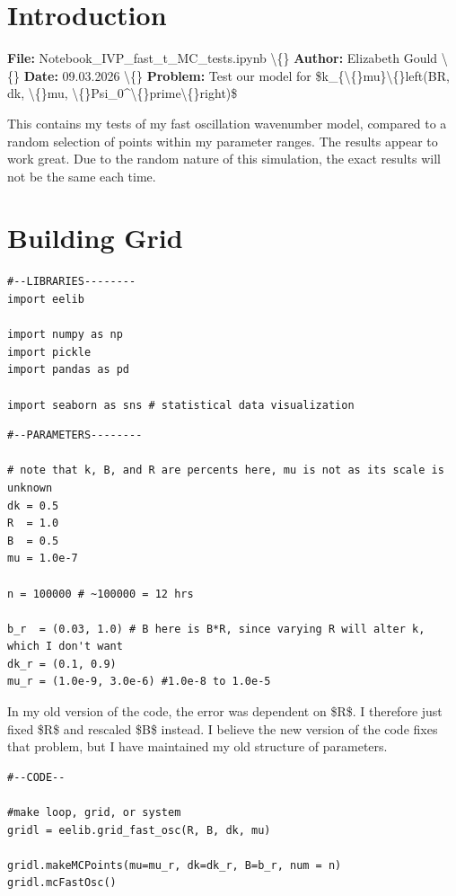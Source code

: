 \documentclass{article}
\begin{document}
\section{Introduction}


\textbf{File:} Notebook\_IVP\_fast\_t\_MC\_tests.ipynb 
\textbackslash\{\}
\textbf{Author:} Elizabeth Gould
\textbackslash\{\}
\textbf{Date:} 09.03.2026
\textbackslash\{\}
\textbf{Problem:} Test our model for \$k\_\{\textbackslash\{\}mu\}\textbackslash\{\}left(BR, dk, \textbackslash\{\}mu, \textbackslash\{\}Psi\_0\textasciicircum{}\textbackslash\{\}prime\textbackslash\{\}right)\$

This contains my tests of my fast oscillation wavenumber model, compared to a random selection of points within my parameter ranges. The results appear to work great. Due to the random nature of this simulation, the exact results will not be the same each time.

\section{Building Grid}

\begin{lstlisting}
#--LIBRARIES--------
import eelib

import numpy as np
import pickle
import pandas as pd

import seaborn as sns # statistical data visualization\end{lstlisting}

\begin{lstlisting}
#--PARAMETERS--------

# note that k, B, and R are percents here, mu is not as its scale is unknown
dk = 0.5
R  = 1.0
B  = 0.5
mu = 1.0e-7

n = 100000 # ~100000 = 12 hrs

b_r  = (0.03, 1.0) # B here is B*R, since varying R will alter k, which I don't want
dk_r = (0.1, 0.9)
mu_r = (1.0e-9, 3.0e-6) #1.0e-8 to 1.0e-5
\end{lstlisting}

In my old version of the code, the error was dependent on \$R\$. I therefore just fixed \$R\$ and rescaled \$B\$ instead. I believe the new version of the code fixes that problem, but I have maintained my old structure of parameters.

\begin{lstlisting}
#--CODE--

#make loop, grid, or system
gridl = eelib.grid_fast_osc(R, B, dk, mu)

gridl.makeMCPoints(mu=mu_r, dk=dk_r, B=b_r, num = n)
gridl.mcFastOsc()\end{lstlisting}
\end{document}
